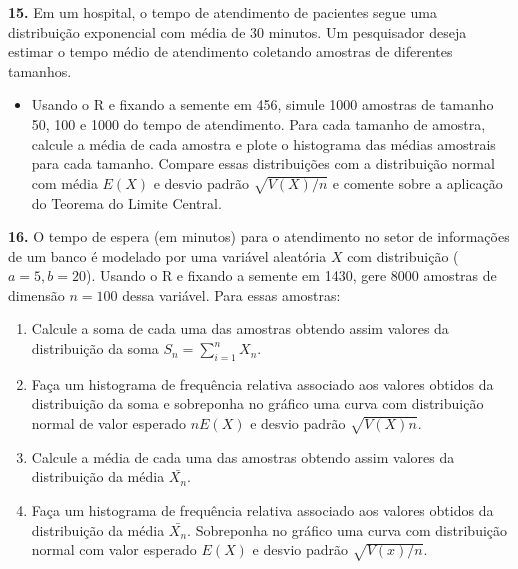 \documentclass[
]{book}
\providecommand{\tightlist}{%
  \setlength{\itemsep}{0pt}\setlength{\parskip}{0pt}}
\begin{document}
\textbf{15.} Em um hospital, o tempo de atendimento de pacientes segue uma
distribuição exponencial com média de 30 minutos. Um pesquisador deseja
estimar o tempo médio de atendimento coletando amostras de diferentes
tamanhos.

\begin{itemize}
\tightlist
\item
  Usando o R e fixando a semente em 456, simule 1000 amostras de
  tamanho 50, 100 e 1000 do tempo de atendimento. Para cada tamanho de
  amostra, calcule a média de cada amostra e plote o histograma das
  médias amostrais para cada tamanho. Compare essas distribuições com
  a distribuição normal com média \(E(X)\) e desvio padrão
  \(\sqrt{V(X)/n}\) e comente sobre a aplicação do Teorema do Limite
  Central.
\end{itemize}

\textbf{16.} O tempo de espera (em minutos) para o atendimento no setor de
informações de um banco é modelado por uma variável aleatória \(X\) com
distribuição (\(a=5, b=20\)). Usando o R e fixando a
semente em 1430, gere 8000 amostras de dimensão \(n=100\) dessa variável.
Para essas amostras:

\begin{enumerate}
\def\labelenumi{(\alph{enumi})}
\item
  Calcule a soma de cada uma das amostras obtendo assim valores da
  distribuição da soma \(S_{n} = \sum_{i=1}^{n}X_{n}\).
\item
  Faça um histograma de frequência relativa associado aos valores
  obtidos da distribuição da soma e sobreponha no gráfico uma curva com
  distribuição normal de valor esperado \(nE(X)\) e desvio padrão
  \(\sqrt{V(X)n}\).
\item
  Calcule a média de cada uma das amostras obtendo assim valores
  da distribuição da média \(\bar{X_{n}}\).
\item
  Faça um histograma de frequência relativa associado aos valores
  obtidos da distribuição da média \(\bar{X_{n}}\). Sobreponha no gráfico
  uma curva com distribuição normal com valor esperado \(E(X)\) e desvio
  padrão \(\sqrt{V(x)/n}\).
\end{enumerate}
\end{document}
